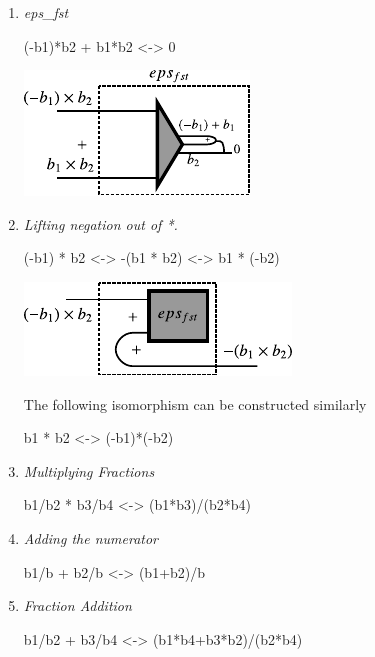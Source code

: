 \documentclass[preprint]{sigplanconf}
\begin{document}
\begin{enumerate}

\item 
\emph{ {{eps_{fst} }} }

{{(-b1)*b2 + b1*b2 <-> 0}}

\begin{center}
  \includegraphics{diagrams/eps_fst.pdf}
\end{center}

\item 
\emph{Lifting negation out of {{*}}. }

{{(-b1) * b2 <-> -(b1 * b2) <-> b1 * (-b2)}}

\begin{center}
  \includegraphics{diagrams/mult_neg.pdf}
\end{center}

The following isomorphism can be constructed similarly 

{{b1 * b2 <-> (-b1)*(-b2)}}





\item 
\emph{Multiplying Fractions}

{{b1/b2 * b3/b4 <-> (b1*b3)/(b2*b4)}}


\item 
\emph{Adding the numerator}

{{b1/b + b2/b <-> (b1+b2)/b}}

\item 
\emph{Fraction Addition}

{{b1/b2 + b3/b4 <-> (b1*b4+b3*b2)/(b2*b4) }}

\end{enumerate}
\end{document}
